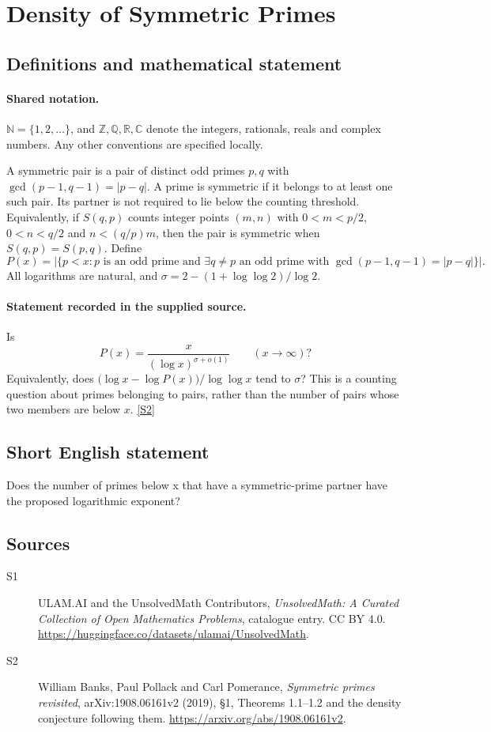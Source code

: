\documentclass[11pt]{article}
\newcommand{\sref}[2]{\hyperlink{source:#1:#2}{[S#2]}}
\begin{document}
\section{Density of Symmetric Primes}\label{statement}

\subsection{Definitions and mathematical statement}

\paragraph{Shared notation.}$\mathbb N=\{1,2,\ldots\}$, and $\mathbb Z,\mathbb Q,\mathbb R,\mathbb C$ denote the integers, rationals, reals and complex numbers. Any other conventions are specified locally.


A symmetric pair is a pair of distinct odd primes $p,q$ with $\gcd(p-1,q-1)=|p-q|$. A prime is symmetric if it belongs to at least one such pair. Its partner is not required to lie below the counting threshold. Equivalently, if $S(q,p)$ counts integer points $(m,n)$ with $0<m<p/2$, $0<n<q/2$ and $n<(q/p)m$, then the pair is symmetric when $S(q,p)=S(p,q)$. Define
\[
 P(x)=\bigl|\{p<x:p\text{ is an odd prime and }\exists q\ne p\text{ an odd prime with }\gcd(p-1,q-1)=|p-q|\}\bigr|.
\]
All logarithms are natural, and $\sigma=2-(1+\log\log2)/\log2$.
\paragraph{Statement recorded in the supplied source.}
Is
\[
 P(x)=\frac{x}{(\log x)^{\sigma+o(1)}}\qquad(x\to\infty)?
\]
Equivalently, does $\bigl(\log x-\log P(x)\bigr)/\log\log x$ tend to $\sigma$? This is a counting question about primes belonging to pairs, rather than the number of pairs whose two members are below $x$. \sref{statement}{2}
\subsection{Short English statement}
Does the number of primes below x that have a symmetric-prime partner have the proposed logarithmic exponent?
\subsection{Sources}
\begin{description}
\item[\hypertarget{source:statement:1}{S1}] ULAM.AI and the UnsolvedMath Contributors, \emph{UnsolvedMath: A Curated Collection of Open Mathematics Problems}, catalogue entry. CC BY 4.0. \url{https://huggingface.co/datasets/ulamai/UnsolvedMath}.
\item[\hypertarget{source:statement:2}{S2}] William Banks, Paul Pollack and Carl Pomerance, \emph{Symmetric primes revisited}, arXiv:1908.06161v2 (2019), §1, Theorems 1.1--1.2 and the density conjecture following them. \url{https://arxiv.org/abs/1908.06161v2}.
\end{description}
\label{end:statement}
\end{document}
